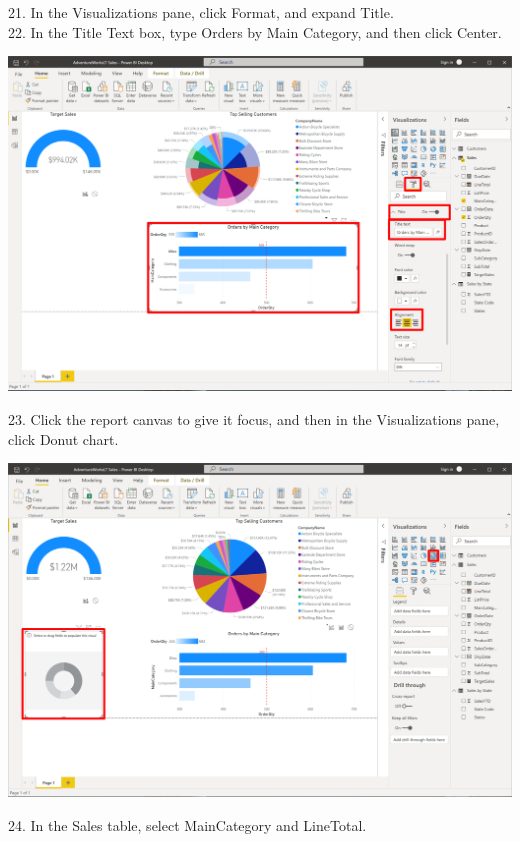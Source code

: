 \documentclass[12pt,letterpaper]{article}
\begin{document}
21. In the Visualizations pane, click Format, and expand Title.
\\22. In the Title Text box, type Orders by Main Category, and then click Center.
\begin{center}
    \includegraphics[width=15cm]{img/88.png}
\end{center}
23. Click the report canvas to give it focus, and then in the Visualizations pane, click Donut chart.
\begin{center}
    \includegraphics[width=15cm]{img/89.png}
    \vspace{1cm}
\end{center}
24. In the Sales table, select MainCategory and LineTotal.
\end{document}
